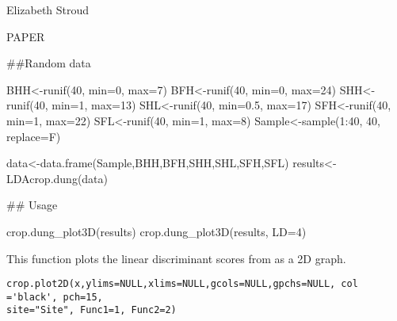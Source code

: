 \documentclass[a4paper]{book}
\begin{document}
%
\begin{Author}\relax
Elizabeth Stroud

\end{Author}
%
\begin{References}\relax
PAPER

\end{References}
%
\begin{SeeAlso}\relax
{} 
\end{SeeAlso}
%
\begin{Examples}
\begin{ExampleCode}
##Random data

BHH<-runif(40, min=0, max=7)
BFH<-runif(40, min=0, max=24)
SHH<-runif(40, min=1, max=13)
SHL<-runif(40, min=0.5, max=17)
SFH<-runif(40, min=1, max=22)
SFL<-runif(40, min=1, max=8)
Sample<-sample(1:40, 40, replace=F)

data<-data.frame(Sample,BHH,BFH,SHH,SHL,SFH,SFL)
results<-LDAcrop.dung(data)

## Usage

crop.dung_plot3D(results)
crop.dung_plot3D(results, LD=4)
\end{ExampleCode}
\end{Examples}
%
\begin{Description}\relax
This function plots the linear discriminant scores from  as a 2D graph.

\end{Description}
%
\begin{Usage}
\begin{verbatim}
crop.plot2D(x,ylims=NULL,xlims=NULL,gcols=NULL,gpchs=NULL, col ='black', pch=15,
site="Site", Func1=1, Func2=2)
\end{verbatim}
\end{Usage}
%
\end{document}
